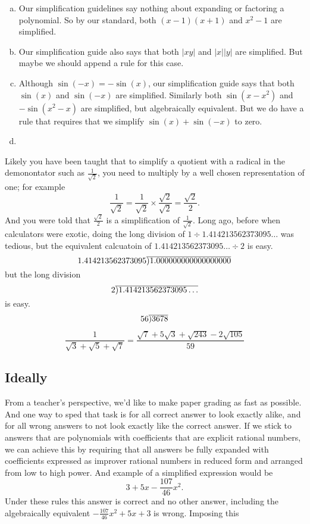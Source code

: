 \documentclass[12pt,fleqn]{article}
\newenvironment{alphalist}{
  \begin{enumerate}[(a)]
    \addtolength{\itemsep}{-0.5\itemsep}}
  {\end{enumerate}}
\newcommand\showdiv[1]{\overline{\smash{)}#1}}
\begin{document}
\begin{alphalist}

\item Our simplification guidelines say nothing about expanding or factoring a polynomial. So by our standard, both $(x-1)(x+1)$ and $x^2 - 1$ are simplified.

\item Our simplification guide also says that both $|x y|$ and $|x| |y|$ are simplified. But maybe we should append a rule for this case.

\item Although \(\sin(-x) = - \sin(x)\), our simplification guide says that both $\sin(x)$ and $\sin(-x)$ are simplified.  Similarly both
$\sin(x-x^2)$ and $-\sin(x^2-x)$ are simplified, but algebraically equivalent. But we do have a rule that requires
that we simplify $\sin(x) + \sin(-x)$ to zero.




\item 
\end{alphalist}








Likely you have been taught that to simplify a quotient with a radical in the demonontator such as $\frac{1}{\sqrt{2}}$, you need to multiply by a well chosen representation of one; for example
\[
   \frac{1}{\sqrt{2}} = \frac{1}{\sqrt{2}} \times \frac{\sqrt{2}}{\sqrt{2}}  = \frac{\sqrt{2}}{2}.
\]
And you were told that \(\frac{\sqrt{2}}{2}\) is a simplification of \(\frac{1}{\sqrt{2}} \). 
Long ago, before when calculators were exotic, doing the long division of \(1 \div 1.414213562373095\dots\) was tedious, but
the equivalent calcuatoin of \(1.414213562373095 \dots \div 2\) is easy.
\[
   1.414213562373095 \showdiv{1.000000000000000000}
\]
but the long division
\[
     2 \showdiv{1.414213562373095 \dots} 
\]
is easy.
\[
56 \showdiv{3678}
\]

\[
\frac{1}{\sqrt{3}+\sqrt{5} + \sqrt{7}} = \frac{\sqrt{7}+ 5 \sqrt{3} +\sqrt{243} - 2 \sqrt{105}}{59}
\]
\subsection*{Ideally}

From a teacher's perspective,  we'd like to make paper grading as fast as possible. And one way to sped that task is for all correct answer to look exactly alike, and for all wrong answers to not look exactly like the correct answer.  If we stick to answers that are polynomials with coefficients that are explicit 
rational numbers, we can achieve this by requiring that all answers be fully expanded with coefficients expressed as improver rational numbers in reduced form and arranged from low to high power.  And example of a simplified expression would be
\[
     3 + 5 x - \frac{107}{46} x^2.
\] 
Under these rules this answer is correct and no other answer, including the algebraically equivalent \( - \frac{107}{46} x^2 + 5 x + 3\) is wrong. Imposing this
\end{document}
